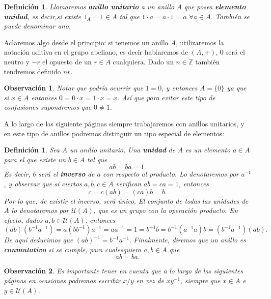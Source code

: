 \documentclass[12pt]{article}
\newtheorem{definition}[theorem]{Definición}
\newtheorem{observation}{Observación}[theorem]
\begin{document}
\begin{definition} Llamaremos \textbf{anillo unitario} a un anillo $A$ que posea \textbf{elemento unidad}, es decir,si existe $1_{A} = 1 \in A$ tal que $1 \cdot a = a \cdot 1 = a$ \hspace{0.1cm} $\forall a \in A$. También se puede denominar uno.
\end{definition}

Aclaremos algo desde el principio: si tenemos un anillo $A$, utilizaremos la notación aditiva en el grupo abeliano, es decir hablaremos de $(A,+)$, $0$ será el neutro y $-r$ el opuesto de un $r \in A$ cualquiera. Dado un $n \in \mathbb{Z}$ también tendremos definido $nr$.

\begin{observation} Notar que podría ocurrir que $1 = 0$, y entonces $A = \lbrace 0 \rbrace$ ya que si $x \in A$ entonces $0 =  0 \cdot x = 1 \cdot x = x$. Así que para evitar este tipo de confusiones supondremos que $0 \neq 1$.
\end{observation}

A lo largo de las siguiente páginas siempre trabajaremos con anillos unitarios, y en este tipo de anillos podremos distinguir un tipo especial de elementos: 

\begin{definition}Sea $A$ un anillo unitario. Una \textbf{unidad} de $A$ es un elemento $a \in A$ para el que existe un $b \in A$ tal que $$ab = ba = 1.$$ Es decir, $b$ será el \textbf{inverso} de $a$ con respecto al producto. Lo denotaremos por $a^{-1}$, y observar que si ciertos $a, b, c \in A$ verifican $ab = ca = 1$, entonces $$c = c(ab) = (ca)b = b.$$ Por lo que, de existir el inverso, será único. El conjunto de todas las unidades de $A$ lo denotaremos por $\mathcal{U}(A)$, que es un grupo con la operación producto. En efecto, dados $a,b \in \mathcal{U}(A)$, entonces $$(ab)(b^{-1}a^{-1}) = a(bb^{-1})a^{-1} = aa^{-1} = 1 = b^{-1}b = b^{-1}(a^{-1}a)b = (b^{-1}a^{-1})(ab).$$ De aquí deducimos que $(ab)^{-1} = b^{-1}a^{-1}.$ Finalmente, diremos que un anillo es \textbf{conmutativo} si se cumple, para cualesquiera $a,b \in A$ que $$ab = ba.$$
\end{definition}

\begin{observation}Es importante tener en cuenta que a lo largo de las siguientes páginas en ocasiones podremos escribir $x/y$ en vez de $xy^{-1}$, siempre que $x \in A$ e $y \in \mathcal{U}(A)$.
\end{observation}
\end{document}

